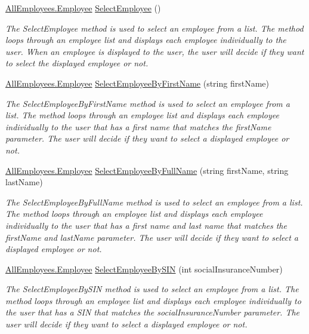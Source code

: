 \begin{DoxyCompactItemize}
\hyperlink{class_all_employees_1_1_employee}{All\+Employees.\+Employee} \hyperlink{class_the_company_1_1_container_afab9fa9b66ba08355e405c3bd015b46e}{Select\+Employee} ()
\begin{DoxyCompactList}\small\item\em The Select\+Employee method is used to select an employee from a list. The method loops through an employee list and displays each employee individually to the user. When an employee is displayed to the user, the user will decide if they want to select the displayed employee or not. \end{DoxyCompactList}\item 
\hyperlink{class_all_employees_1_1_employee}{All\+Employees.\+Employee} \hyperlink{class_the_company_1_1_container_aaea10d0d9e57806faf7d8615944d8958}{Select\+Employee\+By\+First\+Name} (string first\+Name)
\begin{DoxyCompactList}\small\item\em The Select\+Employee\+By\+First\+Name method is used to select an employee from a list. The method loops through an employee list and displays each employee individually to the user that has a first name that matches the first\+Name parameter. The user will decide if they want to select a displayed employee or not. \end{DoxyCompactList}\item 
\hyperlink{class_all_employees_1_1_employee}{All\+Employees.\+Employee} \hyperlink{class_the_company_1_1_container_a35868a52012d36cf7312691e0bcc258c}{Select\+Employee\+By\+Full\+Name} (string first\+Name, string last\+Name)
\begin{DoxyCompactList}\small\item\em The Select\+Employee\+By\+Full\+Name method is used to select an employee from a list. The method loops through an employee list and displays each employee individually to the user that has a first name and last name that matches the first\+Name and last\+Name parameter. The user will decide if they want to select a displayed employee or not. \end{DoxyCompactList}\item 
\hyperlink{class_all_employees_1_1_employee}{All\+Employees.\+Employee} \hyperlink{class_the_company_1_1_container_ad0f416f961bbc66bb160d00f33279d4d}{Select\+Employee\+By\+S\+I\+N} (int social\+Insurance\+Number)
\begin{DoxyCompactList}\small\item\em The Select\+Employee\+By\+S\+I\+N method is used to select an employee from a list. The method loops through an employee list and displays each employee individually to the user that has a S\+I\+N that matches the social\+Insurance\+Number parameter. The user will decide if they want to select a displayed employee or not. \end{DoxyCompactList}\item 

\end{DoxyCompactItemize}
